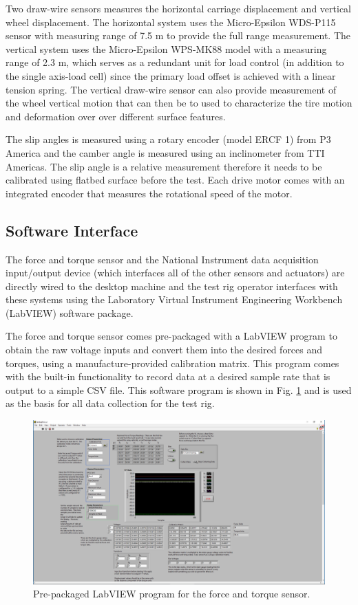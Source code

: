 \documentclass{article}
\begin{document}
Two draw-wire sensors measures the horizontal carriage displacement and vertical wheel displacement. The horizontal system uses the Micro-Epsilon WDS-P115 sensor with measuring range of 7.5 m to provide the full range measurement. The vertical system uses the Micro-Epsilon WPS-MK88 model with a measuring range of 2.3 m, which serves as a redundant unit for load control (in addition to the single axis-load cell) since the primary load offset is achieved with a linear tension spring. The vertical draw-wire sensor can also provide measurement of the wheel vertical motion  that can then be to used to characterize the tire motion and deformation over over different surface features. 

The slip  angles is measured using a rotary encoder (model ERCF 1) from P3 America and the camber angle is measured using an inclinometer from TTI Americas. The slip  angle is a  relative measurement therefore it needs to be calibrated using flatbed surface before the test. Each drive motor comes with an integrated encoder that measures the rotational speed of the motor. 

\subsection{Software Interface}

The force and torque sensor and the National Instrument data acquisition input/output device (which interfaces all of the other sensors and actuators) are directly wired to the desktop machine and the test rig operator interfaces with these systems using the Laboratory Virtual Instrument Engineering Workbench (LabVIEW) software package.

The force and torque sensor comes pre-packaged with a LabVIEW program to obtain the raw voltage inputs and convert them into the desired forces and torques, using a manufacture-provided calibration matrix. This program comes with the built-in functionality to record data at a desired sample rate that is output to a simple CSV file. This software program is shown in Fig. \ref{fig:FT-screenshot} and is used as the basis for all data collection for the test rig.

\begin{figure}[hbt!]
\centering
\includegraphics[width=1.0\textwidth]{general-images/FT_screenshot.png}
\caption{Pre-packaged LabVIEW program for the force and torque sensor.}
\label{fig:FT-screenshot}
\end{figure}
\end{document}
